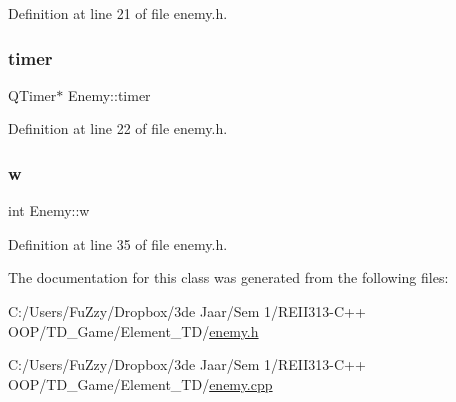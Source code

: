 Definition at line 21 of file enemy.\+h.

\mbox{\label{class_enemy_a70012228edd80bdbf5d71374f0b7ef9e}} 
\subsubsection{\texorpdfstring{timer}{timer}}
{\footnotesize\ttfamily Q\+Timer$\ast$ Enemy\+::timer}



Definition at line 22 of file enemy.\+h.

\mbox{\label{class_enemy_a259bfaab0f0d06c9ec2cb15c787e0b3a}} 
\subsubsection{\texorpdfstring{w}{w}}
{\footnotesize\ttfamily int Enemy\+::w\hspace{0.3cm}{\ttfamily [private]}}



Definition at line 35 of file enemy.\+h.



The documentation for this class was generated from the following files\+:\begin{DoxyCompactItemize}
\item 
C\+:/\+Users/\+Fu\+Zzy/\+Dropbox/3de Jaar/\+Sem 1/\+R\+E\+I\+I313-\/\+C++ O\+O\+P/\+T\+D\+\_\+\+Game/\+Element\+\_\+\+T\+D/\hyperlink{enemy_8h}{enemy.\+h}\item 
C\+:/\+Users/\+Fu\+Zzy/\+Dropbox/3de Jaar/\+Sem 1/\+R\+E\+I\+I313-\/\+C++ O\+O\+P/\+T\+D\+\_\+\+Game/\+Element\+\_\+\+T\+D/\hyperlink{enemy_8cpp}{enemy.\+cpp}\end{DoxyCompactItemize}

